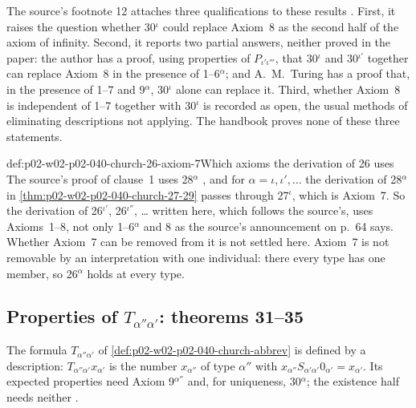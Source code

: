 The source's footnote 12 attaches three qualifications to these results
\cite[\S6, p.~66, n.~12]{Church1940}.  First, it raises the question whether
30\(^\iota\) could replace Axiom~8 as the second half of the axiom of infinity.
Second, it reports two partial answers, neither proved in the paper: the
author has a proof, using properties of \(P_{\iota'\iota'''}\), that 30\(^\iota\)
and 30\(^{\iota'}\) together can replace Axiom~8 in the presence of
1--6\(^\alpha\); and A.~M.~Turing has a proof that, in the presence of 1--7 and
9\(^\alpha\), 30\(^\iota\) alone can replace it.  Third, whether Axiom~8 is
independent of 1--7 together with 30\(^\iota\) is recorded as open, the usual
methods of eliminating descriptions not applying.  The handbook proves none
of these three statements.

\begin{hbwarning}{def:p02-w02-p02-040-church-26-axiom-7}{Which axioms the derivation of 26 uses}
The source's proof of clause~1 uses 28\(^\alpha\)
\cite[\S6, pp.~66--67]{Church1940}, and for \(\alpha=\iota,\iota',\ldots\)
the derivation of 28\(^\alpha\) in \cref{thm:p02-w02-p02-040-church-27-29}
passes through 27\(^\iota\), which is Axiom~7.  So the derivation of
26\(^{\iota'}\), 26\(^{\iota''}\), \ldots{} written here, which follows the
source's, uses Axioms~1--8, not only 1--6\(^\alpha\) and 8 as the source's
announcement on p.~64 says.  Whether Axiom~7 can be removed from it is not
settled here.  Axiom~7 is not removable by an interpretation with one
individual: there every type has one member, so 26\(^\alpha\) holds at every
type.
\end{hbwarning}

\subsection{Properties of \(T_{\alpha''\alpha'}\): theorems 31--35}

The formula \(T_{\alpha''\alpha'}\) of \cref{def:p02-w02-p02-040-church-abbrev}
is defined by a description: \(T_{\alpha''\alpha'}x_{\alpha'}\) is the number
\(x_{\alpha''}\) of type \(\alpha''\) with
\(x_{\alpha''}S_{\alpha'\alpha'}0_{\alpha'}=x_{\alpha'}\).  Its expected
properties need Axiom 9\(^{\alpha''}\) and, for uniqueness, 30\(^\alpha\);
the existence half needs neither \cite[\S7, p.~67]{Church1940}.

